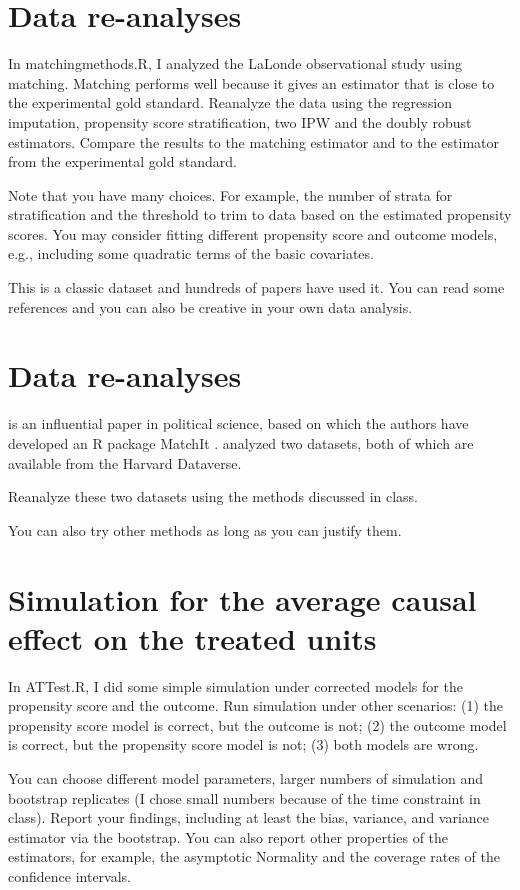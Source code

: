 \documentclass[11pt]{article}
\theoremstyle{definition}
\begin{document}
\section{Data re-analyses}


In matchingmethods.R, I analyzed the LaLonde observational study using matching. Matching performs well because it gives an estimator that is close to the experimental gold standard. Reanalyze the data using the regression imputation, propensity score stratification, two IPW and the doubly robust estimators. Compare the results to the matching estimator and to the estimator from the experimental gold standard.

Note that you have many choices. For example, the number of strata for stratification and the threshold to trim to data based on the estimated propensity scores. You may consider fitting different propensity score and outcome models, e.g., including some quadratic terms of the basic covariates. 

This is a classic dataset and hundreds of papers have used it. You can read some references \citep{dehejia1999causal, hainmueller2012entropy} and you can also be creative in your own data analysis.



\section{Data re-analyses}

\citet{ho2007matching} is an influential paper in political science, based on which the authors have developed an R package MatchIt \citep{ho2011matchit}. \citet{ho2007matching} analyzed two datasets, both of which are available from the Harvard Dataverse.

Reanalyze these two datasets using the methods discussed in class. 

You can also try other methods as long as you can justify them. 



\section{Simulation for the average causal effect on the treated units}


In ATTest.R, I did some simple simulation under corrected models for the propensity score and the outcome. Run simulation under other scenarios: (1) the propensity score model is correct, but the outcome is not; (2) the outcome model is correct, but the propensity score model is not; (3) both models are wrong. 

You can choose different model parameters, larger numbers of simulation and bootstrap replicates (I chose small numbers because of the time constraint in class). Report your findings, including at least the bias, variance, and variance estimator via the bootstrap. You can also report other properties of the estimators, for example, the asymptotic Normality and the coverage rates of the confidence intervals. 





\end{document}

